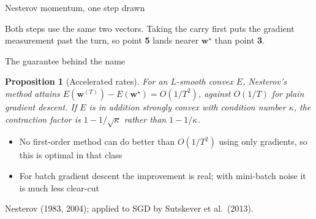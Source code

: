 \documentclass[aspectratio=169, 11pt]{beamer}
\newtheorem{propx}[theorem]{Proposition}
\newcommand{\srcline}[1]{%
  \par\vspace{0.25em}%
  {\scriptsize\color{mcMuted}\hfill #1\par}}
\newcommand{\src}[3]{}      %
\begin{document}
\begin{frame}{Nesterov momentum, one step drawn}
\begin{center}
  \end{center}
  \vspace{-0.35em}
  \begin{redhighlight}
    Both steps use the same two vectors. Taking the carry first puts the
    gradient measurement past the turn, so point \textbf{5} lands nearer
    $\mathbf{w}^\star$ than point \textbf{3}.
  \end{redhighlight}
\end{frame}

\begin{frame}{The guarantee behind the name}
  \src{nesterov2004}{chapter}{2}
  \src{bishop2024}{section}{7.3.1}
  \vspace{-0.2em}
  \begin{propx}[Accelerated rates]\label{th:nest}
    \small
    For an $L$-smooth convex $E$, Nesterov's method attains
    $E(\mathbf{w}^{(T)}) - E(\mathbf{w}^\star) = O(1/T^{2})$, against $O(1/T)$ for plain
    gradient descent. If $E$ is in addition strongly convex with
    condition number $\kappa$, the contraction factor is
    $1 - 1/\sqrt{\kappa}$ rather than $1 - 1/\kappa$.
  \end{propx}
  \vspace{0.4em}
  \begin{itemize}\itemsep0.4em
    \item No first-order method can do better than $O(1/T^2)$ using only
          gradients, so this is optimal in that class
    \item For \alert{batch} gradient descent the improvement is real;
          with mini-batch noise it is much less clear-cut
  \end{itemize}
  \srcline{Nesterov (1983, 2004); applied to SGD by Sutskever et
  al.~(2013).}
\end{frame}
\end{document}
